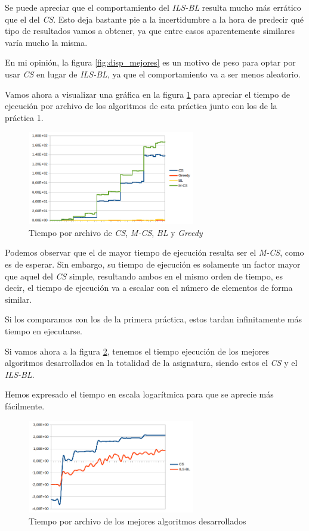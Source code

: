 Se puede apreciar que el comportamiento del \textit{ILS-BL} resulta mucho más errático que el del \textit{CS}. Esto deja bastante pie a la incertidumbre a la hora de predecir qué tipo de resultados vamos a obtener, ya que entre casos aparentemente similares varía mucho la misma.

En mi opinión, la figura \ref{fig:disp_mejores} es un motivo de peso para optar por usar \textit{CS} en lugar de \textit{ILS-BL}, ya que el comportamiento va a ser menos aleatorio.

Vamos ahora a visualizar una gráfica en la figura \ref{fig:tiempoTodos} para apreciar el tiempo de ejecución por archivo de los algoritmos de esta práctica junto con los de la práctica 1.

\begin{figure}[H]
    \centering
    \includegraphics[width=0.65\textwidth]{"data/tiempo_primeros.png"}
    \caption{Tiempo por archivo de \textit{CS}, \textit{M-CS}, \textit{BL} y \textit{Greedy}}
    \label{fig:tiempoTodos}
\end{figure}

Podemos observar que el de mayor tiempo de ejecución resulta ser el \textit{M-CS}, como es de esperar. Sin embargo, su tiempo de ejecución es solamente un factor mayor que aquel del \textit{CS} simple, resultando ambos en el mismo orden de tiempo, es decir, el tiempo de ejecución va a escalar con el número de elementos de forma similar.

Si los comparamos con los de la primera práctica, estos tardan infinitamente más tiempo en ejecutarse.

Si vamos ahora a la figura \ref{fig:tiempoMejores}, tenemos el tiempo ejecución de los mejores algoritmos desarrollados en la totalidad de la asignatura, siendo estos el \textit{CS} y el \textit{ILS-BL}.

Hemos expresado el tiempo en escala logarítmica para que se aprecie más fácilmente.

\begin{figure}[H]
    \centering
    \includegraphics[width=0.65\textwidth]{"data/tiempo_mejores.png"}
    \caption{Tiempo por archivo de los mejores algoritmos desarrollados}
    \label{fig:tiempoMejores}
\end{figure}

